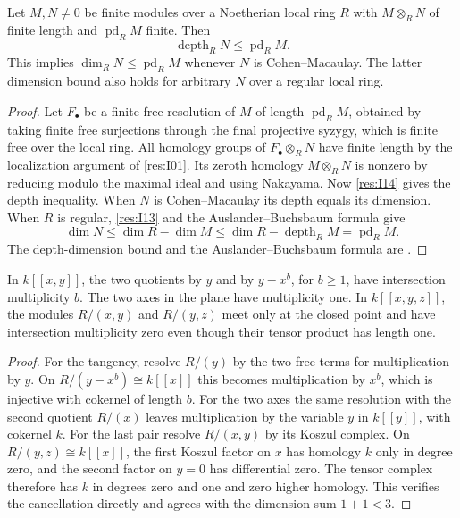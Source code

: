 \begin{corollary}\label{res:I15}
Let \(M,N\ne 0\) be finite modules over a Noetherian local
ring \(R\) with \(M\otimes_R N\) of finite length and
\(\operatorname{pd}_R M\) finite. Then
\[
 \operatorname{depth}_R N\le \operatorname{pd}_R M .
\]
This implies \(\dim_R N\le\operatorname{pd}_R M\) whenever
\(N\) is Cohen--Macaulay. The latter dimension bound also
holds for arbitrary \(N\) over a regular local ring.
\end{corollary}
\begin{proof}
Let \(F_\bullet\) be a finite free resolution of \(M\) of
length \(\operatorname{pd}_R M\), obtained by taking finite free
surjections through the final projective syzygy, which is finite
free over the local ring. All homology groups of
\(F_\bullet\otimes_R N\) have finite length by the localization
argument of \ref{res:I01}. Its zeroth homology \(M\otimes_R N\)
is nonzero by reducing modulo the maximal ideal and using
Nakayama. Now \ref{res:I14} gives the depth inequality.
When \(N\) is Cohen--Macaulay its depth equals its dimension.
When \(R\) is regular, \ref{res:I13} and the
Auslander--Buchsbaum formula give
\[
 \dim N\le\dim R-\dim M
          \le\dim R-\operatorname{depth}_R M
          =\operatorname{pd}_R M.
\]
The depth-dimension bound and the Auslander--Buchsbaum formula
are \cite[DP-02 and DP-13]{core}.
\end{proof}

\begin{example}\label{res:I16}
In \(k[[x,y]]\), the two quotients by \(y\) and by \(y-x^b\),
for \(b\ge1\), have intersection multiplicity \(b\). The
two axes in the plane have multiplicity one. In
\(k[[x,y,z]]\), the modules \(R/(x,y)\) and \(R/(y,z)\)
meet only at the closed point and have intersection
multiplicity zero even though their tensor product has length
one.
\end{example}
\begin{proof}
For the tangency, resolve \(R/(y)\) by the two free terms for
multiplication by \(y\). On \(R/(y-x^b)\cong k[[x]]\) this
becomes multiplication by \(x^b\), which is injective with
cokernel of length \(b\). For the two axes the same resolution
with the second quotient \(R/(x)\) leaves multiplication by
the variable \(y\) in \(k[[y]]\), with cokernel \(k\).
For the last pair resolve \(R/(x,y)\) by its Koszul
complex. On \(R/(y,z)\cong k[[x]]\), the first Koszul
factor on \(x\) has homology \(k\) only in degree zero,
and the second factor on \(y=0\) has differential zero.
The tensor complex therefore has \(k\) in degrees zero
and one and zero higher homology. This verifies the
cancellation directly and agrees with the dimension sum
\(1+1<3\).
\end{proof}

